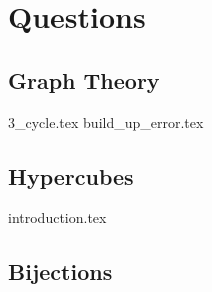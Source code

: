 \documentclass{exam}
\begin{document}
\clearpage 

\section{Questions}
\subsection{Graph Theory}
\begin{enumerate}
{3_cycle.tex}
{build_up_error.tex}
\end{enumerate}

\subsection{Hypercubes}
\begin{enumerate}
{introduction.tex}
\end{enumerate}

\subsection{Bijections}

\end{document}
